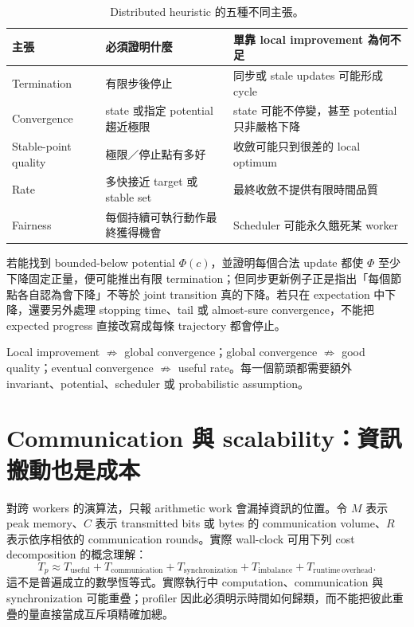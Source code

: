 \documentclass[11pt,a4paper,oneside,openany]{book}
\begin{document}
\begin{table}[htbp]
\centering
\caption{Distributed heuristic 的五種不同主張。}
\begin{tabularx}{\textwidth}{@{}p{}YY@{}}
\toprule
主張 & 必須證明什麼 & 單靠 local improvement 為何不足 \\
\midrule
Termination & 有限步後停止 & 同步或 stale updates 可能形成 cycle \\
Convergence & state 或指定 potential 趨近極限 & state 可能不停變，甚至 potential 只非嚴格下降 \\
Stable-point quality & 極限／停止點有多好 & 收斂可能只到很差的 local optimum \\
Rate & 多快接近 target 或 stable set & 最終收斂不提供有限時間品質 \\
Fairness & 每個持續可執行動作最終獲得機會 & Scheduler 可能永久餓死某 worker \\
\bottomrule
\end{tabularx}
\label{tab:convergence-obligations}
\end{table}

若能找到 bounded-below potential $\Phi(c)$，並證明每個合法 update 都使 $\Phi$ 至少下降固定正量，便可能推出有限 termination；但同步更新例子正是指出「每個節點各自認為會下降」不等於 joint transition 真的下降。若只在 expectation 中下降，還要另外處理 stopping time、tail 或 almost-sure convergence，不能把 expected progress 直接改寫成每條 trajectory 都會停止。

\begin{coreintuition}
Local improvement $\not\Rightarrow$ global convergence；global convergence $\not\Rightarrow$ good quality；eventual convergence $\not\Rightarrow$ useful rate。每一個箭頭都需要額外 invariant、potential、scheduler 或 probabilistic assumption。
\end{coreintuition}

\section{Communication 與 scalability：資訊搬動也是成本}

對跨 workers 的演算法，只報 arithmetic work 會漏掉資訊的位置。令 $M$ 表示 peak memory、$C$ 表示 transmitted bits 或 bytes 的 communication volume、$R$ 表示依序相依的 communication rounds。實際 wall-clock 可用下列 cost decomposition 的概念理解：
\[
 T_p
 \approx T_{\mathrm{useful}}
 +T_{\mathrm{communication}}
 +T_{\mathrm{synchronization}}
 +T_{\mathrm{imbalance}}
 +T_{\mathrm{runtime\ overhead}}.
\]
這不是普遍成立的數學恆等式。實際執行中 computation、communication 與 synchronization 可能重疊；profiler 因此必須明示時間如何歸類，而不能把彼此重疊的量直接當成互斥項精確加總。
\end{document}
